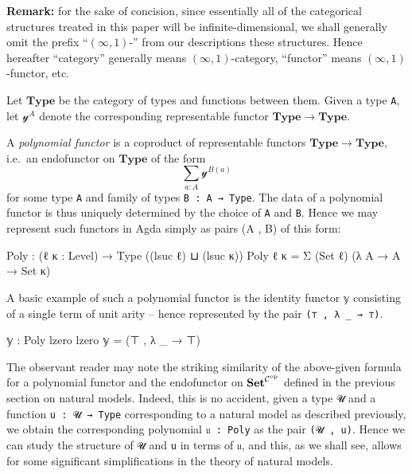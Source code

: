\documentclass[
  11pt,
  oneside,
  article]{memoir}
\newenvironment{Shaded}{}{}
\newcommand{\DataTypeTok}[1]{\textcolor[rgb]{0.56,0.13,0.00}{#1}}
\newcommand{\NormalTok}[1]{#1}
\newcommand{\OtherTok}[1]{\textcolor[rgb]{0.00,0.44,0.13}{#1}}
\theoremstyle{definition}
\theoremstyle{plain}
\newcommand{\Cat}[1]{\mathbf{#1}}%
\newcommand{\op}{^\tn{op}}
\newcommand{\tn}[1]{\textnormal{#1}}
\newcommand{\smset}{\Cat{Set}}
\newcommand{\yon}{\mathcal{y}}
\newcommand{\0}{\textsf{0}}
\newcommand{\1}{\tn{\textsf{1}}}
\begin{document}
\textbf{Remark:} for the sake of concision, since essentially all of the
categorical structures treated in this paper will be
infinite-dimensional, we shall generally omit the prefix ``\((\infty,1)\)-''
from our descriptions these structures. Hence hereafter ``category''
generally means \((\infty,1)\)-category, ``functor'' means
\((\infty,1)\)-functor, etc.

Let \(\mathbf{Type}\) be the category of types and functions between
them. Given a type \texttt{A}, let \(\yon^A\) denote the corresponding
representable functor \(\mathbf{Type} \to \mathbf{Type}\).

A \emph{polynomial functor} is a coproduct of representable functors
\(\mathbf{Type} \to \mathbf{Type}\), i.e.~an endofunctor on
\(\mathbf{Type}\) of the form \[
\sum_{a : A} \yon^{B(a)}
\] for some type \texttt{A} and family of types
\texttt{B\ :\ A\ →\ Type}. The data of a polynomial functor is thus
uniquely determined by the choice of \texttt{A} and \texttt{B}. Hence we
may represent such functors in Agda simply as pairs (A , B) of this
form:

\begin{Shaded}
\begin{Highlighting}[]
\NormalTok{Poly }\OtherTok{:} \OtherTok{(}\NormalTok{ℓ κ }\OtherTok{:}\NormalTok{ Level}\OtherTok{)} \OtherTok{→}\NormalTok{ Type }\OtherTok{((}\NormalTok{lsuc ℓ}\OtherTok{)}\NormalTok{ ⊔ }\OtherTok{(}\NormalTok{lsuc κ}\OtherTok{))}
\NormalTok{Poly ℓ κ }\OtherTok{=}\NormalTok{ Σ }\OtherTok{(}\DataTypeTok{Set}\NormalTok{ ℓ}\OtherTok{)} \OtherTok{(λ}\NormalTok{ A }\OtherTok{→}\NormalTok{ A }\OtherTok{→} \DataTypeTok{Set}\NormalTok{ κ}\OtherTok{)}
\end{Highlighting}
\end{Shaded}

A basic example of such a polynomial functor is the identity functor
\texttt{𝕪} consisting of a single term of unit arity -- hence
represented by the pair \texttt{(⊤\ ,\ λ\ \_\ →\ ⊤)}.

\begin{Shaded}
\begin{Highlighting}[]
\NormalTok{𝕪 }\OtherTok{:}\NormalTok{ Poly lzero lzero}
\NormalTok{𝕪 }\OtherTok{=} \OtherTok{(}\NormalTok{⊤ , }\OtherTok{λ} \OtherTok{\_} \OtherTok{→}\NormalTok{ ⊤}\OtherTok{)}
\end{Highlighting}
\end{Shaded}

The observant reader may note the striking similarity of the above-given
formula for a polynomial functor and the endofunctor on
\(\smset^{\mathcal{C}\op}\) defined in the previous section on
natural models. Indeed, this is no accident, given a type \texttt{𝓤} and
a function \texttt{u\ :\ 𝓤\ →\ Type} corresponding to a natural model as
described previously, we obtain the corresponding polynomial
\texttt{𝔲\ :\ Poly} as the pair \texttt{(𝓤\ ,\ u)}. Hence we can study
the structure of \texttt{𝓤} and \texttt{u} in terms of \texttt{𝔲}, and
this, as we shall see, allows for some significant simplifications in
the theory of natural models.
\end{document}
